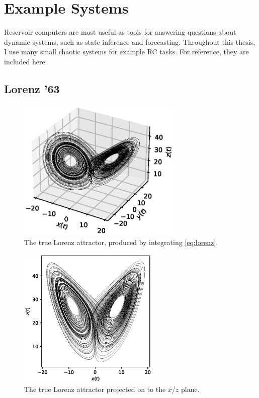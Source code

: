 \chapter{Example Systems}\label{ch:systems}

Reservoir computers are most useful as tools for answering questions
about dynamic systems, such as state inference and
forecasting. Throughout this thesis, I use many small chaotic systems
for example RC tasks. For reference, they are included here.

\section{Lorenz '63}\label{sec:lorenz}

\begin{figure}
  \includegraphics[width=0.7\textwidth]{figures/lorenz-3d}
  \caption{The true Lorenz attractor, produced by integrating \cref{eq:lorenz}.}%
  \label{fig:lorenz-3d}
\end{figure}

\begin{figure}
  \includegraphics[width=0.6\textwidth]{figures/lorenz}
  \caption{The true Lorenz attractor projected on to the $x$/$z$ plane.}%
  \label{fig:lorenz}
\end{figure}

